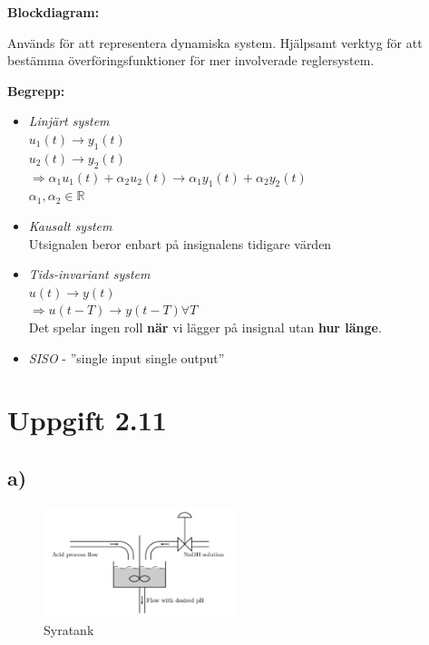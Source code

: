 \documentclass[12pt]{article}
\begin{document}
\textbf{Blockdiagram:}


Används för att representera dynamiska system. Hjälpsamt verktyg för att bestämma överföringsfunktioner för mer involverade reglersystem.

\textbf{Begrepp:}
\begin{itemize}
\item \textit{Linjärt system} \\
$u_1(t) \rightarrow y_1(t)$ \\
$u_2(t) \rightarrow y_2(t)$ \\
$\Rightarrow \alpha_1 u_1(t) + \alpha_2 u_2(t) \rightarrow \alpha_1y_1(t) + \alpha_2y_2(t)$ \\
$\alpha_1, \alpha_2 \in \mathbb{R}$
\item \textit{Kausalt system} \\
Utsignalen beror enbart på insignalens tidigare värden
\item \textit{Tids-invariant system} \\
$u(t) \rightarrow y(t) $ \\
$\Rightarrow u(t-T) \rightarrow y(t-T) \forall T$ \\
Det spelar ingen roll \textbf{när} vi lägger på insignal utan \textbf{hur länge}.
\item \textit{SISO} - ''single input single output''
\end{itemize}

\section*{Uppgift 2.11}
\subsection*{a)}

\begin{figure}[h!]
  \centering
  \includegraphics[width=0.5\textwidth]{syratank}
  \caption{Syratank}
  \label{fig:syratank}
\end{figure}
\end{document}
